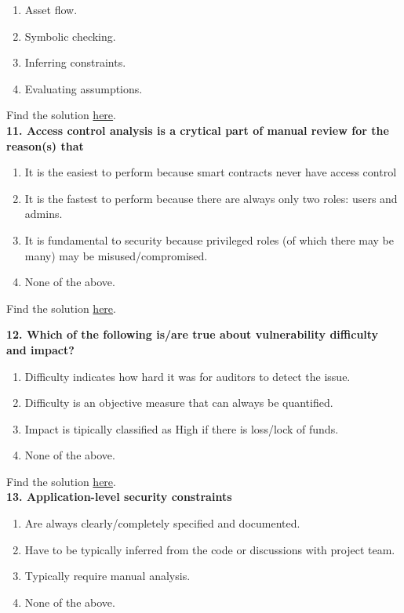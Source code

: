 \begin{enumerate}[label=\Alph*.]
    \item Asset flow.
    \item Symbolic checking.
    \item Inferring constraints.
    \item Evaluating assumptions.
\end{enumerate}

Find the solution \hyperref[sec:exam6_q10]{here}.\\

\textbf{11. Access control analysis is a crytical part of manual review for the reason(s) that}

\begin{enumerate}[label=\Alph*.]
    \item It is the easiest to perform because smart contracts never have access control
    \item It is the fastest to perform because there are always only two roles: users and admins.
    \item It is fundamental to security because privileged roles (of which there may be many) may be misused/compromised.
    \item None of the above.
\end{enumerate}

Find the solution \hyperref[sec:exam6_q11]{here}.\\

\pagebreak

\textbf{12. Which of the following is/are true about vulnerability difficulty and impact?}

\begin{enumerate}[label=\Alph*.]
    \item Difficulty indicates how hard it was for auditors to detect the issue.
    \item Difficulty is an objective measure that can always be quantified.
    \item Impact is tipically classified as High if there is loss/lock of funds.
    \item None of the above.
\end{enumerate}

Find the solution \hyperref[sec:exam6_q12]{here}.\\

\textbf{13. Application-level security constraints}

\begin{enumerate}[label=\Alph*.]
    \item Are always clearly/completely specified and documented.
    \item Have to be typically inferred from the code or discussions with project team.
    \item Typically require manual analysis.
    \item None of the above.
\end{enumerate}

